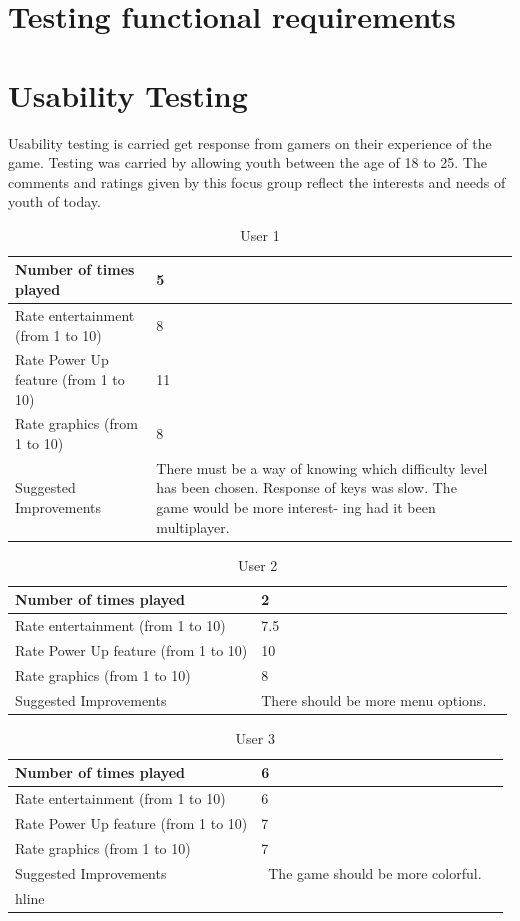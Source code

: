 \documentclass[12pt]{article}
\begin{document}
\section{Testing functional requirements}
\section{Usability Testing}
Usability testing is carried get response from gamers on their experience of the game. Testing
was carried by allowing youth between the age of 18 to 25. The comments and ratings given
by this focus group reflect the interests and needs of youth of today.

\begin{center}
	\begin{longtable}{ | l | p{8cm} | p{8cm}|}
	\caption{User 1} \\ \hline \label{TblUsr1} 
	Number of times played & 5 \\\hline
	Rate entertainment (from 1 to 10) &8 \\\hline
	Rate Power Up feature (from 1 to 10) &11 \\\hline
	Rate graphics (from 1 to 10) & 8 \\ \hline
	Suggested Improvements & There must be a way of knowing which difficulty level has been chosen. Response of keys
was slow. The game would be more interest-
ing had it been multiplayer.\\ \hline
	\end{longtable}

	\begin{longtable}{ | l | p{8cm} | p{8cm}|}
	\caption{User 2} \\ \hline \label{TblUsr2} 
	Number of times played & 2  \\ \hline
	Rate entertainment (from 1 to 10) & 7.5 \\ \hline
	Rate Power Up feature (from 1 to 10) & 10 \\ \hline
	Rate graphics (from 1 to 10) & 8 \\ \hline
	Suggested Improvements & There should be more menu options.\\ \hline
	\end{longtable}

	\begin{longtable}{ | l | p{8cm} | p{8cm}|}
	\caption{User 3} \\ \hline \label{TblUsr3} 
	Number of times played & 6  \\ \hline
	Rate entertainment (from 1 to 10) & 6 \\ \hline
	Rate Power Up feature (from 1 to 10) & 7 \\ \hline
	Rate graphics (from 1 to 10) & 7 \\ \hline
	Suggested Improvements & \ The game should be more colorful. \\hline
	\end{longtable}


\end{center}
\end{document}
